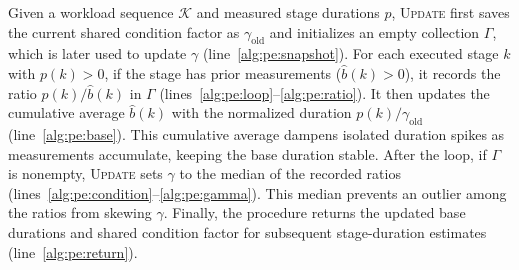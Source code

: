 Given a workload sequence \(\mathcal K\) and measured stage durations \(p\), \textsc{Update} first saves the current shared condition factor as \(\gamma_{\mathrm{old}}\) and initializes an empty collection \(\Gamma\), which is later used to update \(\gamma\) (line~\ref{alg:pe:snapshot}).
For each executed stage \(k\) with \(p(k)>0\), if the stage has prior measurements (\(\hat b(k)>0\)), it records the ratio \(p(k)/\hat b(k)\) in \(\Gamma\) (lines~\ref{alg:pe:loop}--\ref{alg:pe:ratio}).
It then updates the cumulative average \(\hat b(k)\) with the normalized duration \(p(k)/\gamma_{\mathrm{old}}\) (line~\ref{alg:pe:base}).
This cumulative average dampens isolated duration spikes as measurements accumulate, keeping the base duration stable.
After the loop, if \(\Gamma\) is nonempty, \textsc{Update} sets \(\gamma\) to the median of the recorded ratios (lines~\ref{alg:pe:condition}--\ref{alg:pe:gamma}).
This median prevents an outlier among the ratios from skewing \(\gamma\).
Finally, the procedure returns the updated base durations and shared condition factor for subsequent stage-duration estimates (line~\ref{alg:pe:return}).
